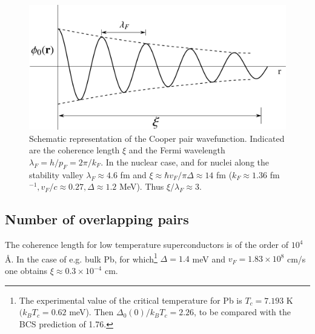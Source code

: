 \begin{subappendices}
     
        

 \begin{figure}[h]
 	\centerline{\includegraphics*[width=12cm,angle=0	]{nutshell/figs/fig3B2}}
 	\caption{Schematic representation of the Cooper pair wavefunction. Indicated are the coherence length $\xi$ and the Fermi wavelength $\lambda_F=h/p_F=2\pi/k_F$. In the nuclear case, and for nuclei along the stability valley $\lambda_F\approx4.6$ fm and $\xi\approx \hbar v_F/\pi\Delta\approx14$ fm ($k_F\approx 1.36$ fm $^{-1}, v_F/c\approx0.27, \Delta\approx 1.2$ MeV). Thus $\xi/\lambda_F\approx 3$.}\label{fig3B2}
 \end{figure}
 





\subsection{Number of overlapping pairs}
 

The coherence length for low temperature superconductors is of the order of $10^4$\AA. In the case of e.g. bulk Pb, for which\footnote{\label{foot75}  The experimental value of the critical temperature for Pb is $T_c=7.193$ K $(k_BT_c=0.62$ meV).  Then  $\Delta_0(0)/k_BT_c=2.26$, to be compared with the BCS prediction of 1.76. } $\Delta=1.4$ meV and $v_F=1.83\times10^8$ cm/s one obtains $\xi\approx0.3\times10^{-4}$ cm. 


\end{subappendices}
